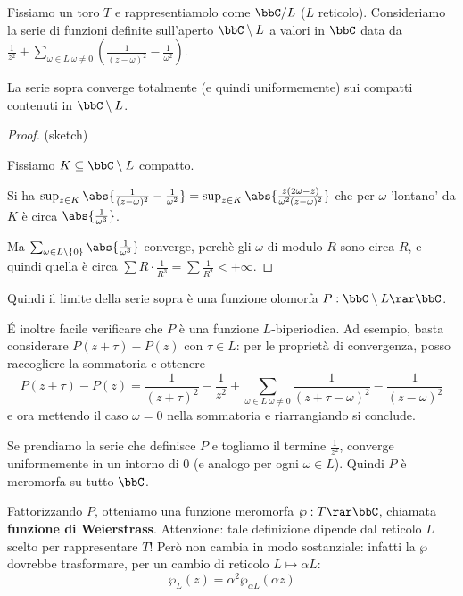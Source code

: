 Fissiamo un toro $T$ e rappresentiamolo come $\bbC/L$ ($L$ reticolo).
Consideriamo la serie di funzioni definite sull'aperto $\bbC\setminus L$ a valori in $\bbC$ data da $\frac{1}{z^2}+\sum_{\omega\in L\ \omega\not=0}(\frac{1}{(z-\omega)^2}-\frac{1}{\omega^2})$.

\begin{proposizione}
La serie sopra converge totalmente (e quindi uniformemente) sui compatti contenuti in $\bbC\setminus L$.
\end{proposizione}
\begin{proof}(sketch)

Fissiamo $K\subseteq\bbC\setminus L$ compatto.

Si ha $\sup_{z\in K}\abs{\frac{1}{(z-\omega)^2}-\frac{1}{\omega^2}}=\sup_{z\in K}\abs{\frac{z(2\omega-z)}{\omega^2(z-\omega)^2}}$ che per $\omega$ 'lontano' da $K$ è circa $\abs{\frac{1}{\omega^3}}$.

Ma $\sum_{\omega\in L\setminus\{0\}}\abs{\frac{1}{\omega^3}}$ converge, perchè
gli $\omega$ di modulo $R$ sono circa $R$, e quindi quella è circa $\sum R\cdot\frac{1}{R^3}=\sum\frac{1}{R^2}<+\infty$.
\end{proof}

Quindi il limite della serie sopra è una funzione olomorfa $P:\bbC\setminus L\rar\bbC$.

\'E inoltre facile verificare che $P$ è una funzione $L$-biperiodica.
Ad esempio, basta considerare $P(z+\tau)-P(z)$ con $\tau \in L$: per le proprietà di convergenza, posso raccogliere la sommatoria e ottenere
\[ P(z+\tau) - P(z) = \frac1{(z+\tau)^2} - \frac1{z^2} + \sum_{\omega \in L\ \omega\ne 0} \frac1{(z+\tau-\omega)^2}-\frac1{(z-\omega)^2}\]
e ora mettendo il caso $\omega=0$ nella sommatoria e riarrangiando si conclude.

Se prendiamo la serie che definisce $P$ e togliamo il termine $\frac{1}{z^2}$, converge uniformemente in un intorno di $0$ (e analogo per ogni $\omega\in L$).
Quindi $P$ è meromorfa su tutto $\bbC$.

Fattorizzando $P$, otteniamo una funzione meromorfa $\wp:T\rar\bbC$, chiamata \textbf{funzione di Weierstrass}. Attenzione: tale definizione dipende dal reticolo $L$ scelto per rappresentare $T$! Però non cambia in modo sostanziale: infatti la $\wp$ dovrebbe trasformare, per un cambio di reticolo $L \mapsto \alpha L$:
\[
 \wp_L(z) = \alpha^2 \wp_{\alpha L}(\alpha z) 
\]

